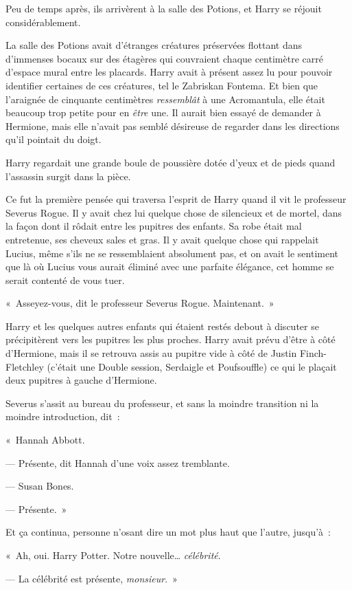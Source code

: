 Peu de temps après, ils arrivèrent à la salle des Potions, et Harry se réjouit considérablement.

La salle des Potions avait d'étranges créatures préservées flottant dans d'immenses bocaux sur des étagères qui couvraient chaque centimètre carré d'espace mural entre les placards. Harry avait à présent assez lu pour pouvoir identifier certaines de ces créatures, tel le Zabriskan Fontema. Et bien que l'araignée de cinquante centimètres \emph{ressemblât} à une Acromantula, elle était beaucoup trop petite pour en \emph{être} une. Il aurait bien essayé de demander à Hermione, mais elle n'avait pas semblé désireuse de regarder dans les directions qu'il pointait du doigt.

Harry regardait une grande boule de poussière dotée d'yeux et de pieds quand l'assassin surgit dans la pièce.

Ce fut la première pensée qui traversa l'esprit de Harry quand il vit le professeur Severus Rogue. Il y avait chez lui quelque chose de silencieux et de mortel, dans la façon dont il rôdait entre les pupitres des enfants. Sa robe était mal entretenue, ses cheveux sales et gras. Il y avait quelque chose qui rappelait Lucius, même s'ils ne se ressemblaient absolument pas, et on avait le sentiment que là où Lucius vous aurait éliminé avec une parfaite élégance, cet homme se serait contenté de vous tuer.

«~Asseyez-vous, dit le professeur Severus Rogue. Maintenant.~»

Harry et les quelques autres enfants qui étaient restés debout à discuter se précipitèrent vers les pupitres les plus proches. Harry avait prévu d'être à côté d'Hermione, mais il se retrouva assis au pupitre vide à côté de Justin Finch-Fletchley (c'était une Double session, Serdaigle et Poufsouffle) ce qui le plaçait deux pupitres à gauche d'Hermione.

Severus s'assit au bureau du professeur, et sans la moindre transition ni la moindre introduction, dit~:

«~Hannah Abbott.

--- Présente, dit Hannah d'une voix assez tremblante.

--- Susan Bones.

--- Présente.~»

Et ça continua, personne n'osant dire un mot plus haut que l'autre, jusqu'à~:

«~Ah, oui. Harry Potter. Notre nouvelle… \emph{célébrité}.

--- La célébrité est présente, \emph{monsieur}.~»

